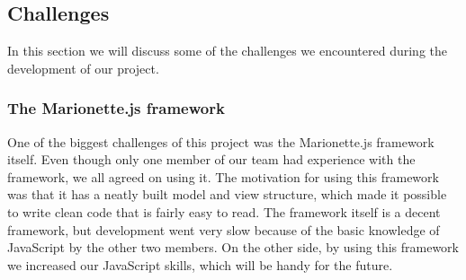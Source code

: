 \documentclass{article}
\begin{document}
\subsection{Challenges}
\label{sec:challenges}
In this section we will discuss some of the challenges we encountered during the development of our project.

\subsubsection{The Marionette.js framework}
One of the biggest challenges of this project was the Marionette.js framework itself. Even though only one member of our team had experience with the framework, we all agreed on using it. The motivation for using this framework was that it has a neatly built model and view structure, which made it possible to write clean code that is fairly easy to read. The framework itself is a decent framework, but development went very slow because of the basic knowledge of JavaScript by the other two members. On the other side, by using this framework we increased our JavaScript skills, which will be handy for the future.
\end{document}

